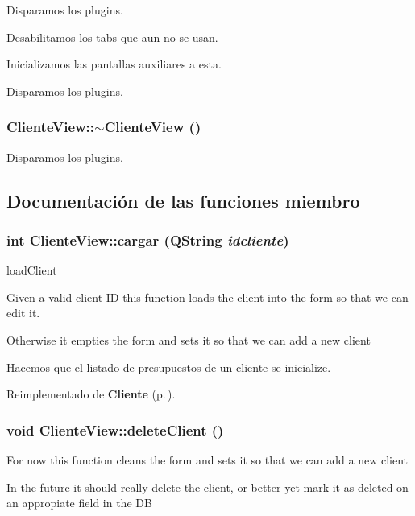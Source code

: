 Disparamos los plugins.

Desabilitamos los tabs que aun no se usan.

Inicializamos las pantallas auxiliares a esta.

Disparamos los plugins. 
\subsubsection{\setlength{\rightskip}{0pt plus 5cm}Cliente\-View::$\sim$Cliente\-View ()}\label{classClienteView_a27}


Disparamos los plugins. 

\subsection{Documentaci\'{o}n de las funciones miembro}
\subsubsection{\setlength{\rightskip}{0pt plus 5cm}int Cliente\-View::cargar (QString {\em idcliente})\hspace{0.3cm}{\tt  [virtual]}}\label{classClienteView_a0}


load\-Client

Given a valid client ID this function loads the client into the form so that we can edit it.

Otherwise it empties the form and sets it so that we can add a new client

Hacemos que el listado de presupuestos de un cliente se inicialize. 

Reimplementado de {\bf Cliente} {\rm (p.\,\pageref{classCliente_a1})}.
\subsubsection{\setlength{\rightskip}{0pt plus 5cm}void Cliente\-View::delete\-Client ()}\label{classClienteView_a3}


For now this function cleans the form and sets it so that we can add a new client

In the future it should really delete the client, or better yet mark it as deleted on an appropiate field in the DB

